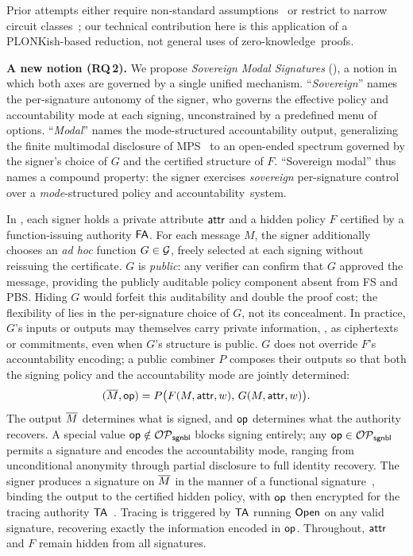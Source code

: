 Prior attempts either require non-standard assumptions~\cite{EPRINT:BonNguOzd21,PETS:CGGSS24}
or restrict to narrow circuit classes~\cite{PQCRYPTO:LNPTW21,ACISP:TNLPS24};
our technical contribution here is this application of a PLONKish-based reduction,
not general uses of zero-knowledge~proofs.

\medskip
\noindent\textbf{A new notion (RQ\,2).}
We propose \emph{Sovereign Modal Signatures} (\SMS), a notion in which both axes are governed by a single unified mechanism.
``\emph{Sovereign}'' names the per-signature autonomy of the signer,
who governs the effective policy and accountability mode at each signing,
unconstrained by a predefined menu of options.
``\emph{Modal}'' names the mode-structured accountability output,
generalizing the finite multimodal disclosure of MPS~\cite{CRYPTO:NGSY22}
to an open-ended spectrum governed by the signer's choice of $G$
and the certified structure of $F$.
``Sovereign modal'' thus names a compound property:
the signer exercises \emph{sovereign} per-signature control
over a \emph{mode}-structured policy and accountability~system.

In \SMS, each signer holds a private attribute $\mathsf{attr}$
and a hidden policy $F$ certified by a function-issuing authority $\mathsf{FA}$.
For each message $M$, the signer additionally chooses an \emph{ad hoc} function
$G \in \mathcal{G}$, freely selected at each signing without reissuing the certificate.
$G$ is \emph{public}: any verifier can confirm that $G$ approved the message,
providing the publicly auditable policy component absent from \textsf{FS} and \textsf{PBS}.
Hiding $G$ would forfeit this auditability and double the proof cost;
the flexibility of \SMS lies in the per-signature choice of $G$, not its concealment.
In practice, $G$'s inputs or outputs may themselves carry private information,
\eg, as ciphertexts or commitments, even when $G$'s structure is public.
$G$ does not override $F$'s accountability encoding;
a public combiner $P$ composes their outputs so that both the signing policy
and the accountability mode are jointly determined:
\begin{equation}\label{equation:determining-tM-op-from-G-F-P}
(\overline{M}, \mathsf{op}) = P\bigl(F(M, \mathsf{attr}, w),\, G(M, \mathsf{attr}, w)\bigr).
\end{equation}
The output $\overline{M}$ determines what is signed,
and $\mathsf{op}$ determines what the authority recovers.
A special value $\mathsf{op} \notin \mathcal{OP}_\mathsf{sgnbl}$ blocks signing entirely;
any $\mathsf{op} \in \mathcal{OP}_\mathsf{sgnbl}$ permits a signature and encodes the accountability mode,
ranging from unconditional anonymity through partial disclosure to full identity recovery.
The signer produces a signature on $\overline{M}$
in the manner of a functional signature~\cite{PKC:BoyGolIva14},
binding the output to the certified hidden policy,
with $\mathsf{op}$ then encrypted for the tracing authority $\mathsf{TA}$~\cite{CRYPTO:NGSY22}.
Tracing is triggered by $\mathsf{TA}$ running $\mathsf{Open}$ on any valid signature,
recovering exactly the information encoded in $\mathsf{op}$.
Throughout, $\mathsf{attr}$ and $F$ remain hidden from all signatures.

